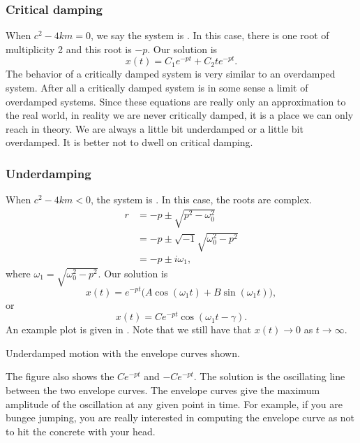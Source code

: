 \subsubsection{Critical damping}

When
$c^2 - 4km = 0$, we say the system is \emph{}.  In this case,
there is one root of multiplicity 2 and this root is $-p$.  Our solution is
\begin{equation*}
x(t) = C_1 e^{-pt} + C_2 t e^{-pt} .
\end{equation*}
The behavior of a critically damped system is very similar to an overdamped
system.  After all a critically damped system is in some sense a limit
of overdamped systems.  Since these equations are really only an
approximation to the real world, in reality we are never critically
damped, it is a place we can only reach in theory.  We are always
a little bit underdamped or a little bit overdamped.  It is better not to
dwell on critical damping.

\subsubsection{Underdamping}

When
$c^2 - 4km < 0$, the system is \emph{}.  In this case,
the roots are complex.
\begin{equation*}
\begin{split}
r & =
-p \pm \sqrt{p^2 - \omega_0^2} \\
& = 
-p \pm \sqrt{-1}\sqrt{\omega_0^2 - p^2} \\
& = 
-p \pm i \omega_1 ,
\end{split}
\end{equation*}
where $\omega_1 =\sqrt{\omega_0^2 - p^2}$.  Our solution is
\begin{equation*}
x(t) = e^{-pt} \bigl( A \cos (\omega_1 t) + B \sin (\omega_1 t) \bigr) ,
\end{equation*}
or
\begin{equation*}
x(t) = C e^{-pt} \cos ( \omega_1 t - \gamma ) .
\end{equation*}
An example plot is given in .  Note that we
still have that $x(t) \to 0$ as $t \to \infty$.

\begin{mywrapfig}{3.25in}
\capstart
{}
\caption{Underdamped motion with the envelope curves shown.\label{mv:underdampedfig}}
\end{mywrapfig}
The figure also 
shows the \emph{}
$C e^{-pt}$ and $-C e^{-pt}$.  The solution
is the oscillating line between the two envelope curves.
The envelope curves give
the maximum amplitude of the oscillation at any given point in time.  For
example, if you are bungee jumping, you are really interested in computing the
envelope curve as not to hit the concrete with your head.

